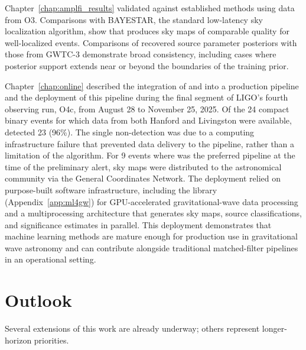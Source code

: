 Chapter~\ref{chap:amplfi_results} validated \amplfi against established methods using data from O3.
Comparisons with BAYESTAR, the standard low-latency sky localization algorithm, show that \amplfi produces sky maps of comparable quality for well-localized events.
Comparisons of recovered source parameter posteriors with those from GWTC-3 demonstrate broad consistency, including cases where posterior support extends near or beyond the boundaries of the training prior.

Chapter~\ref{chap:online} described the integration of \aframe and \amplfi into a production pipeline and the deployment of this pipeline during the final segment of LIGO's fourth observing run, O4c, from August 28 to November 25, 2025.
Of the 24 compact binary events for which data from both Hanford and Livingston were available, \aframe detected 23 (96\%).
The single non-detection was due to a computing infrastructure failure that prevented data delivery to the pipeline, rather than a limitation of the algorithm.
For 9 events where \aframe was the preferred pipeline at the time of the preliminary alert, \amplfi sky maps were distributed to the astronomical community via the General Coordinates Network.
The deployment relied on purpose-built software infrastructure, including the \mlgw library (Appendix~\ref{app:ml4gw}) for GPU-accelerated gravitational-wave data processing and a multiprocessing architecture that generates sky maps, source classifications, and significance estimates in parallel.
This deployment demonstrates that machine learning methods are mature enough for production use in gravitational wave astronomy and can contribute alongside traditional matched-filter pipelines in an operational setting.

\section{Outlook}

Several extensions of this work are already underway; others represent longer-horizon priorities.

